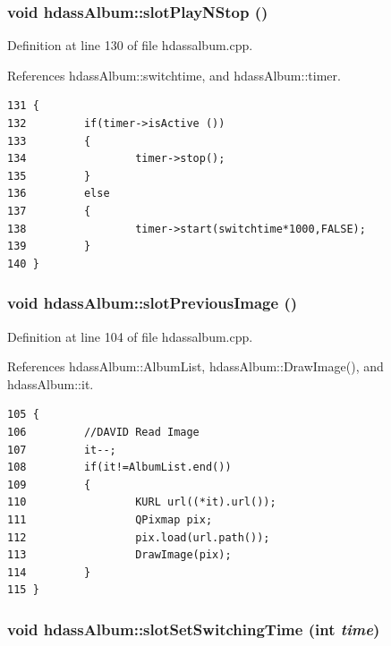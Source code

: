 \subsubsection{\setlength{\rightskip}{0pt plus 5cm}void hdass\-Album::slot\-Play\-NStop ()\hspace{0.3cm}{\tt  [slot, inherited]}}\label{classhdassAlbum_ImageDetiali6}




Definition at line 130 of file hdassalbum.cpp.

References hdass\-Album::switchtime, and hdass\-Album::timer.



\footnotesize\begin{verbatim}131 {
132         if(timer->isActive ())
133         {
134                 timer->stop();
135         }
136         else
137         {
138                 timer->start(switchtime*1000,FALSE);
139         }
140 }
\end{verbatim}\normalsize 
{}
\subsubsection{\setlength{\rightskip}{0pt plus 5cm}void hdass\-Album::slot\-Previous\-Image ()\hspace{0.3cm}{\tt  [slot, inherited]}}\label{classhdassAlbum_ImageDetiali5}




Definition at line 104 of file hdassalbum.cpp.

References hdass\-Album::Album\-List, hdass\-Album::Draw\-Image(), and hdass\-Album::it.



\footnotesize\begin{verbatim}105 {
106         //DAVID Read Image
107         it--;
108         if(it!=AlbumList.end())
109         {
110                 KURL url((*it).url());
111                 QPixmap pix;
112                 pix.load(url.path());
113                 DrawImage(pix);
114         }
115 }
\end{verbatim}\normalsize 
{}
\subsubsection{\setlength{\rightskip}{0pt plus 5cm}void hdass\-Album::slot\-Set\-Switching\-Time (int {\em time})\hspace{0.3cm}{\tt  [slot, inherited]}}\label{classhdassAlbum_ImageDetiali8}





